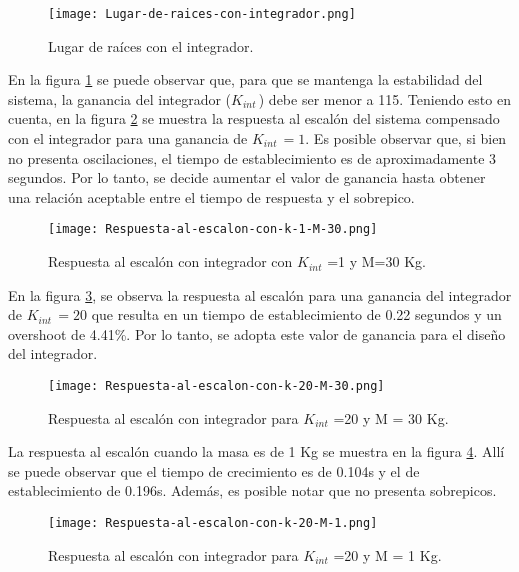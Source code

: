 \begin{figure}[H]
	\centering
	\texttt{[image: Lugar-de-raices-con-integrador.png]}
	\caption{Lugar de raíces con el integrador.}
	\label{fig:lugar-de-raices-con-integrador}
\end{figure}


\noindent En la figura \ref{fig:lugar-de-raices-con-integrador} se puede observar que, para que se mantenga la estabilidad del sistema, la ganancia del integrador ($K_{int\ }$) debe ser menor a 115. Teniendo esto en cuenta, en la figura \ref{fig:respuesta-al-escalon-con-k-1-M-30} se muestra la respuesta al escal\'{o}n del sistema compensado con el integrador para una ganancia de $K_{int\ }=1$.  Es posible observar que, si bien no presenta oscilaciones, el tiempo de establecimiento es de aproximadamente 3 segundos. Por lo tanto, se decide aumentar el valor de ganancia hasta obtener una relaci\'{o}n aceptable entre el tiempo de respuesta y el sobrepico.


\begin{figure}[H]
	\centering
	\texttt{[image: Respuesta-al-escalon-con-k-1-M-30.png]}
	\caption{Respuesta al escalón con integrador con $K_{int}$ =1 y M=30 Kg.}
	\label{fig:respuesta-al-escalon-con-k-1-M-30}
\end{figure}


\noindent En la figura \ref{fig:respuesta-al-escalon-con-k-20-M-30}, se observa la respuesta al escal\'{o}n para una ganancia del integrador de $K_{int\ }=20$ que resulta en un tiempo de establecimiento de 0.22 segundos y un overshoot de 4.41\%. Por lo tanto, se adopta este valor de ganancia para el dise\~{n}o del integrador.

\begin{figure}[H]
	\centering
	\texttt{[image: Respuesta-al-escalon-con-k-20-M-30.png]}
	\caption{Respuesta al escalón con integrador para $K_{int}$ =20 y M = 30 Kg.}
	\label{fig:respuesta-al-escalon-con-k-20-M-30}
\end{figure}


\noindent La respuesta al escal\'{o}n cuando la masa es de 1 Kg se muestra en la figura \ref{fig:respuesta-al-escalon-con-k-20-M-1}. All\'{i} se puede observar que el tiempo de crecimiento es de 0.104s y el de establecimiento de 0.196s. Adem\'{a}s, es posible notar que no presenta sobrepicos.



\begin{figure}[H]
	\centering
	\texttt{[image: Respuesta-al-escalon-con-k-20-M-1.png]}
	\caption{Respuesta al escalón con integrador para $K_{int}$ =20 y M = 1 Kg.}
	\label{fig:respuesta-al-escalon-con-k-20-M-1}
\end{figure}


